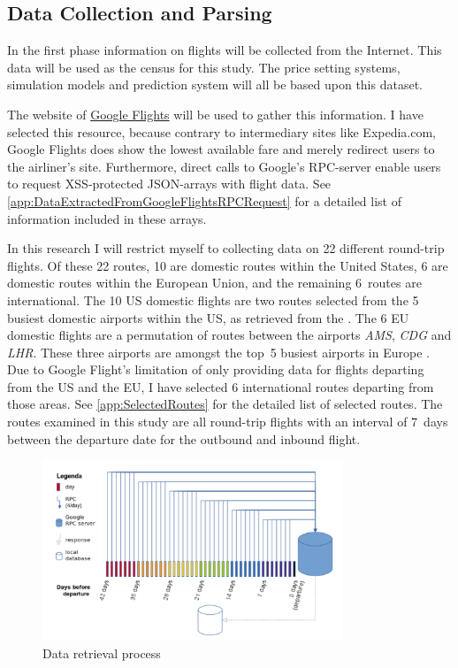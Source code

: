 \subsection{Data Collection and Parsing}
\label{subsec:DataCollectionAndParsing}
In the first phase information on flights will be collected from the Internet. This data will be used as the census for this study. The price setting systems, simulation models and prediction system will all be based upon this dataset.

The website of \href{http://google.nl/flights}{Google Flights} will be used to gather this information. I have selected this resource, because contrary to intermediary sites like Expedia.com, Google Flights does show the lowest available fare and merely redirect users to the airliner's site. Furthermore, direct calls to Google's RPC-server enable users to request XSS-protected JSON-arrays with flight data. See \autoref{app:DataExtractedFromGoogleFlightsRPCRequest} for a detailed list of information included in these arrays.

In this research I will restrict myself to collecting data on 22 different round-trip flights. Of these 22 routes, 10 are domestic routes within the United States, 6 are domestic routes within the European Union, and the remaining 6~routes are international. The 10 US domestic flights are two routes selected from the 5 busiest domestic airports within the US, as retrieved from the . The 6 EU domestic flights are a permutation of routes between the airports \emph{AMS}, \emph{CDG} and \emph{LHR}. These three airports are amongst the top~5 busiest airports in Europe . Due to Google Flight's limitation of only providing data for flights departing from the US and the EU, I have selected 6 international routes departing from those areas. See \autoref{app:SelectedRoutes} for the detailed list of selected routes. The routes examined in this study are all round-trip flights with an interval of 7~days between the departure date for the outbound and inbound flight.

\begin{figure}
\centering
\includegraphics[width=0.8\textwidth]{figures/DataRetrievalProcess}
\caption{Data retrieval process}
\label{fig:DataRetrievalProcess}
\end{figure}

